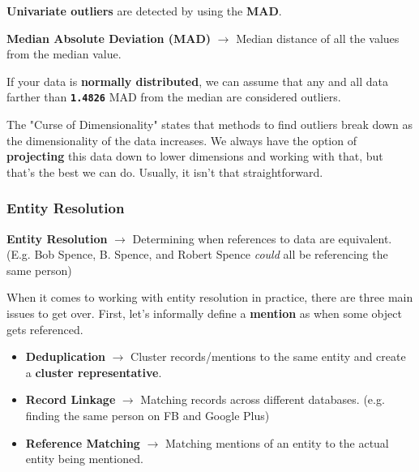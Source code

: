 \documentclass[english, 10pt]{article}
\begin{document}
\textbf{Univariate outliers} are detected by using the \textbf{MAD}.\\

\begin{tcolorbox}[title=Definition:,colframe=red!75!black,colback=red!5!white,arc=0pt,fonttitle=\bfseries]
\textbf{Median Absolute Deviation (MAD)} $\rightarrow$ Median distance of all the values from the median value.
\end{tcolorbox}

\hfill \break If your data is \textbf{normally distributed}, we can assume that any and all data farther than \textbf{\texttt{1.4826}} MAD from the median are considered outliers.\\

\begin{tcolorbox}[title=Aside: Curse of Dimensionality,colframe=black,colback=white,arc=0pt,fonttitle=\bfseries]
The "Curse of Dimensionality" states that methods to find outliers break down as the dimensionality of the data increases. We always have the option of \textbf{projecting} this data down to lower dimensions and working with that, but that's the best we can do. Usually, it isn't that straightforward.
\end{tcolorbox}

\subsubsection{Entity Resolution}

\begin{tcolorbox}[title=Definition:,colframe=red!75!black,colback=red!5!white,arc=0pt,fonttitle=\bfseries]
\textbf{Entity Resolution} $\rightarrow$ Determining when references to data are equivalent. (E.g. Bob Spence, B. Spence, and Robert Spence \textit{could} all be referencing the same person)
\end{tcolorbox}

\hfill \break When it comes to working with entity resolution in practice, there are three main issues to get over. First, let's informally define a \textbf{mention} as when some object gets referenced.

\begin{itemize}
	\item \textbf{Deduplication} $\rightarrow$ Cluster records/mentions to the same entity and create a \textbf{cluster representative}.
	\item \textbf{Record Linkage} $\rightarrow$ Matching records across different databases. (e.g. finding the same person on FB and Google Plus)
	\item \textbf{Reference Matching} $\rightarrow$ Matching mentions of an entity to the actual entity being mentioned.
\end{itemize}
\end{document}
